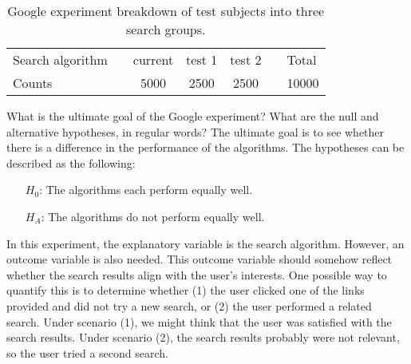 \begin{table}[h]
\centering
\begin{tabular}{ll ccc ll}
\hline
Search algorithm	 & \hspace{1mm} & current & test 1 & test 2 & \hspace{1mm} & Total \\
Counts &		& 5000 & 2500 & 2500 & & 10000 \\
\hline
\end{tabular}
\caption{Google experiment breakdown of test subjects into three search groups.}
\label{googleSearchAlgorithmByAlgorithmOnly}
\end{table}


\begin{example}{What is the ultimate goal of the Google experiment? What are the null and alternative hypotheses, in regular words?}
The ultimate goal is to see whether there is a difference in the performance of the algorithms. The hypotheses can be described as the following:
\begin{itemize}
\item[$H_0$:] The algorithms each perform equally well.
\item[$H_A$:] The algorithms do not perform equally well.
\end{itemize}
\end{example}

In this experiment, the explanatory variable is the search algorithm. However, an outcome variable is also needed. This outcome variable should somehow reflect whether the search results align with the user's interests. One possible way to quantify this is to determine whether (1) the user clicked one of the links provided and did not try a new search, or (2) the user performed a related search. Under scenario (1), we might think that the user was satisfied with the search results. Under scenario (2), the search results probably were not relevant, so the user tried a second search.

